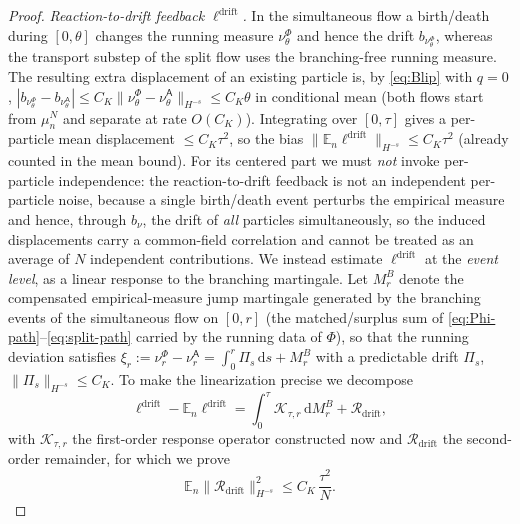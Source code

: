 \documentclass[a4paper,fleqn]{cas-sc}
\theoremstyle{definition}
\theoremstyle{remark}
\begin{document}
\begin{proof}
\emph{Reaction-to-drift feedback $\ell^{\mathrm{drift}}$.} In the simultaneous
flow a birth/death during $[0,\theta]$ changes the running measure
$\nu^\Phi_\theta$ and hence the drift $b_{\nu^\Phi_\theta}$, whereas the
transport substep of the split flow uses the branching-free running measure. The
resulting extra displacement of an existing particle is, by \eqref{eq:Blip} with
$q=0$,
$|b_{\nu^\Phi_\theta}-b_{\nu^{\mathsf A}_\theta}|\le C_K\|\nu^\Phi_\theta
-\nu^{\mathsf A}_\theta\|_{H^{-s}}\le C_K\theta$ in conditional mean (both flows
start from $\mu^N_n$ and separate at rate $O(C_K)$). Integrating over $[0,\tau]$
gives a per-particle mean displacement $\le C_K\tau^2$, so the bias
$\|\mathbb E_n\ell^{\mathrm{drift}}\|_{H^{-s}}\le C_K\tau^2$ (already counted in
the mean bound). For its centered part we must \emph{not} invoke per-particle independence: the
reaction-to-drift feedback is not an independent per-particle noise, because a
single birth/death event perturbs the empirical measure and hence, through $b_\nu$,
the drift of \emph{all} particles simultaneously, so the induced displacements carry
a common-field correlation and cannot be treated as an average of $N$ independent
contributions. We instead estimate $\ell^{\mathrm{drift}}$ at the \emph{event
level}, as a linear response to the branching martingale. Let $M^B_r$ denote the compensated empirical-measure jump martingale generated by
the branching events of the simultaneous flow on $[0,r]$ (the matched/surplus sum
of \eqref{eq:Phi-path}--\eqref{eq:split-path} carried by the running data of
$\Phi$), so that the running deviation satisfies
$\xi_r:=\nu^\Phi_r-\nu^{\mathsf A}_r=\int_0^r\Pi_s\,\mathrm ds+M^B_r$ with a predictable
drift $\Pi_s$, $\|\Pi_s\|_{H^{-s}}\le C_K$. To make the linearization precise we
decompose
\[
\ell^{\mathrm{drift}}-\mathbb E_n\ell^{\mathrm{drift}}=\int_0^\tau\mathcal K_{\tau,r}\,\mathrm dM^B_r+\mathcal R_{\mathrm{drift}},
\]
with $\mathcal K_{\tau,r}$ the first-order response operator constructed now and
$\mathcal R_{\mathrm{drift}}$ the second-order remainder, for which we prove
\begin{equation}\label{eq:Rdrift}
\mathbb E_n\|\mathcal R_{\mathrm{drift}}\|_{H^{-s}}^2\le C_K\,\frac{\tau^2}{N}.
\end{equation}


\end{proof}
\end{document}
